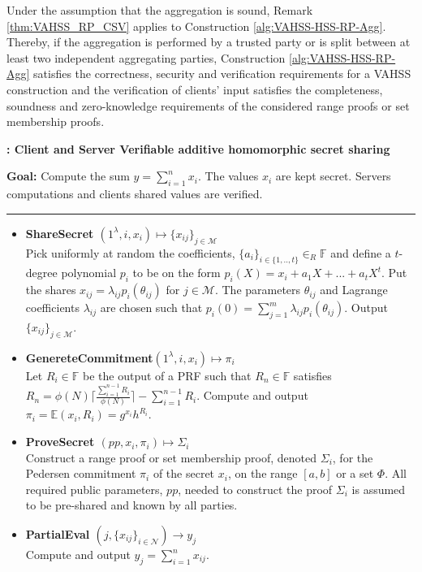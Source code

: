 Under the assumption that the aggregation is sound, Remark \ref{thm:VAHSS_RP_CSV} applies to Construction \ref{alg:VAHSS-HSS-RP-Agg}. Thereby, if the aggregation is performed by a trusted party or is split between at least two independent aggregating parties, Construction \ref{alg:VAHSS-HSS-RP-Agg} satisfies the correctness, security and verification requirements for a VAHSS construction and the verification of clients' input satisfies the completeness, soundness and zero-knowledge requirements of the considered range proofs or set membership proofs. 

\begin{algorithm}
\caption{\textbf{: Client and Server Verifiable additive homomorphic secret sharing}}

\textbf{Goal:} Compute the sum $y = \sum_{i=1}^n x_i$. The values $x_i$ are kept secret. Servers computations and clients shared values are verified. 
\vspace{2pt}\hrule\vspace{2pt}
\begin{itemize}
 \item\textbf{ShareSecret $(1^\lambda,i,x_i) \mapsto \{x_{ij}\}_{j\in\mathcal{M}}$} \\
Pick uniformly at random the coefficients, $\{a_i\}_{i\in\{1,..,t\}}\in_R\mathds{F}$ and define a $t$-degree polynomial $p_i$ to be on the form $p_i(X) = x_i + a_1X+...+a_tX^t$. Put the shares $x_{ij}=\lambda_{ij}p_i(\theta_{ij})$ for $j\in\mathcal{M}$.  The parameters $\theta_{ij}$ and Lagrange coefficients $\lambda_{ij}$ are chosen such that $ p_i(0) = \sum_{j=1}^m \lambda_{ij}p_i(\theta_{ij})$.
Output $\{x_{ij}\}_{j\in\mathcal{M}}$.

\item\textbf{GenereteCommitment$(1^\lambda,i,x_i) \mapsto \pi_i$ }\\
Let $R_i\in\mathds{F}$ be the output of a PRF such that $R_n\in \mathds{F}$  satisfies $R_n = \phi(N)\lceil \frac{\sum_{i=1}^{n-1}R_i}{\phi(N)}\rceil- \sum_{i=1}^{n-1}R_i $. Compute and output $\pi_i = \mathds{E}(x_i,R_i)= g^{x_i}h^{R_i}$.

\item\textbf{ProveSecret $(pp,x_i,\pi_i) \mapsto \Sigma_i$}\\
Construct a range proof or set membership proof, denoted $\Sigma_i$, for the Pedersen commitment $\pi_i$ of the secret $x_i$, on the  range $[a,b]$ or a set $\Phi$. All required public parameters, $pp$, needed to  construct the proof $\Sigma_i$ is assumed to be pre-shared and known by all parties.
\item\textbf{PartialEval $(j,\{x_{ij}\}_{i\in\mathcal{N}})\xrightarrow[]{}y_j$}\\
Compute and output $y_j = \sum_{i=1}^n x_{ij}$.


\end{itemize}
\end{algorithm}
